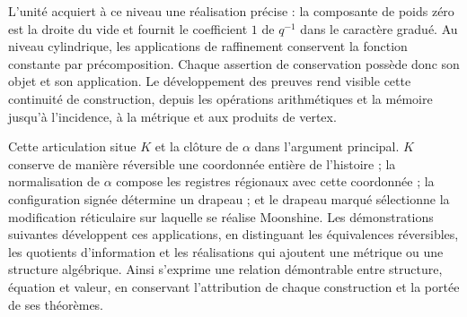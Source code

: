 L'unité acquiert à ce niveau une réalisation précise : la composante
de poids zéro est la droite du vide et fournit le coefficient $1$ de
$q^{-1}$ dans le caractère gradué. Au niveau cylindrique, les
applications de raffinement conservent la fonction constante par
précomposition. Chaque assertion de conservation possède donc son
objet et son application. Le développement des preuves rend visible cette
continuité de construction, depuis les opérations arithmétiques et la
mémoire jusqu'à l'incidence, à la métrique et aux produits de vertex.

Cette articulation situe $K$ et la clôture de $\alpha$ dans l'argument
principal. $K$ conserve de manière réversible une coordonnée entière de
l'histoire ; la normalisation de $\alpha$ compose les registres régionaux
avec cette coordonnée ; la configuration signée détermine un drapeau ; et
le drapeau marqué sélectionne la modification réticulaire sur laquelle se
réalise Moonshine. Les démonstrations suivantes développent ces
applications, en distinguant les équivalences réversibles, les quotients
d'information et les réalisations qui ajoutent une métrique ou une structure
algébrique. Ainsi s'exprime une relation démontrable entre structure,
équation et valeur, en conservant l'attribution de chaque construction et la
portée de ses théorèmes.
